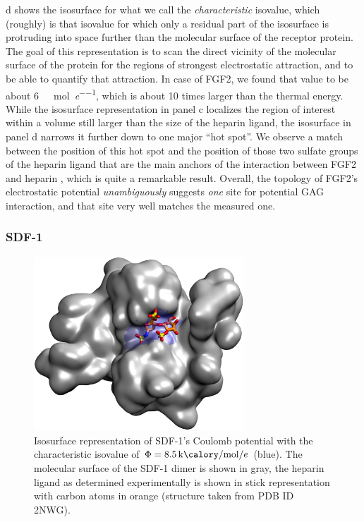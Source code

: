 d shows the isosurface for what we call the
\textit{characteristic} isovalue, which (roughly) is that isovalue for which
only a residual part of the isosurface is protruding into space further than the
molecular surface of the receptor protein. The goal of this representation is to
scan the direct vicinity of the molecular surface of the protein for the regions
of strongest electrostatic attraction, and to be able to quantify that
attraction. In case of FGF2, we found that value to be about
\SI{6}{\kilo\calory\per\mole\per\elementarycharge}, which is about 10 times
larger than the thermal energy. While the isosurface representation in panel c
localizes the region of interest within a volume still larger than the size of
the heparin ligand, the isosurface in panel d narrows it further down to one
major \enquote{hot spot}. We observe a match between the position of this hot
spot and the position of those two sulfate groups of the heparin ligand that are
the main anchors of the interaction between FGF2 and heparin
\cite{faham_heparin_1996}, which is quite a remarkable result. Overall, the
topology of FGF2's electrostatic potential \textit{unambiguously} suggests
\textit{one} site for potential GAG interaction, and that site very well matches
the measured one.


\subsubsection{SDF-1}

\begin{figure}
\centering
\includegraphics[width=0.7\textwidth]{gfx/bspred/sdf1_isopot_8_5_view1_rotated_jcc_pub_001.jpg}
\caption[]{
Isosurface representation of SDF-1's Coulomb potential with the characteristic
isovalue of $\Phi=\SI{8.5}{\kilo\calory\per\mole\per\elementarycharge}$ (blue).
The molecular surface of the SDF-1 dimer is shown in gray, the heparin ligand as
determined experimentally is shown in stick representation with carbon atoms in
orange (structure taken from PDB ID 2NWG).}
\label{fig:bspred:sdf1_estatic}
\end{figure}

